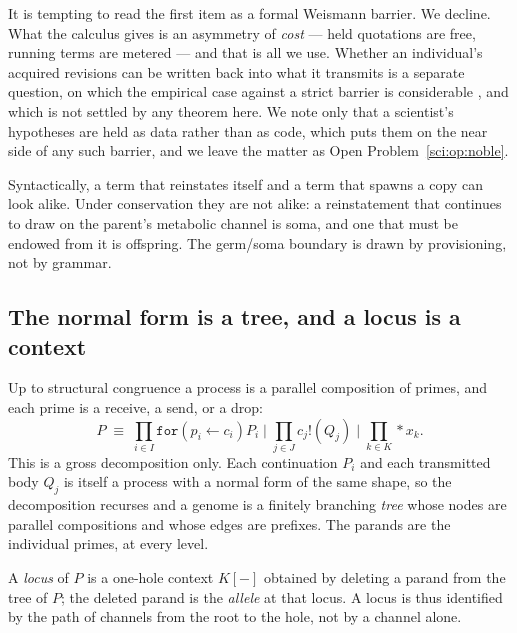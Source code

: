 \begin{remark}
\label{sci:rem:noble}
It is tempting to read the first item as a formal Weismann barrier. We decline. What the calculus
gives is an asymmetry of \emph{cost} --- held quotations are free, running terms are metered --- and
that is all we use. Whether an individual's acquired revisions can be written back into what it
transmits is a separate question, on which the empirical case against a strict barrier is
considerable \cite{Noble}, and which is not settled by any theorem here. We note only that a
scientist's hypotheses are held as data rather than as code, which puts them on the near side of any
such barrier, and we leave the matter as Open Problem~\ref{sci:op:noble}.
\end{remark}

\begin{remark}
\label{sci:rem:provision}
Syntactically, a term that reinstates itself and a term that spawns a copy can look alike. Under
conservation they are not alike: a reinstatement that continues to draw on the parent's metabolic
channel is soma, and one that must be endowed from it is offspring. The germ/soma boundary is drawn by
provisioning, not by grammar.
\end{remark}

\subsection{The normal form is a tree, and a locus is a context}\label{sci:S12.3}

Up to structural congruence a process is a parallel composition of primes, and each prime is a
receive, a send, or a drop:
\[
P \;\equiv\; \prod_{i \in I} \texttt{for}(p_i \leftarrow c_i)P_i
\;\Big|\; \prod_{j \in J} c_j!(Q_j)
\;\Big|\; \prod_{k \in K} \ast x_k .
\]
This is a gross decomposition only. Each continuation $P_i$ and each transmitted body $Q_j$ is itself
a process with a normal form of the same shape, so the decomposition recurses and a genome is a
finitely branching \emph{tree} whose nodes are parallel compositions and whose edges are prefixes. The
parands are the individual primes, at every level.

\begin{definition}
\label{sci:def:locus}
A \emph{locus} of $P$ is a one-hole context $K[-]$ obtained by deleting a parand from the tree of $P$;
the deleted parand is the \emph{allele} at that locus. A locus is thus identified by the path of
channels from the root to the hole, not by a channel alone.
\end{definition}

